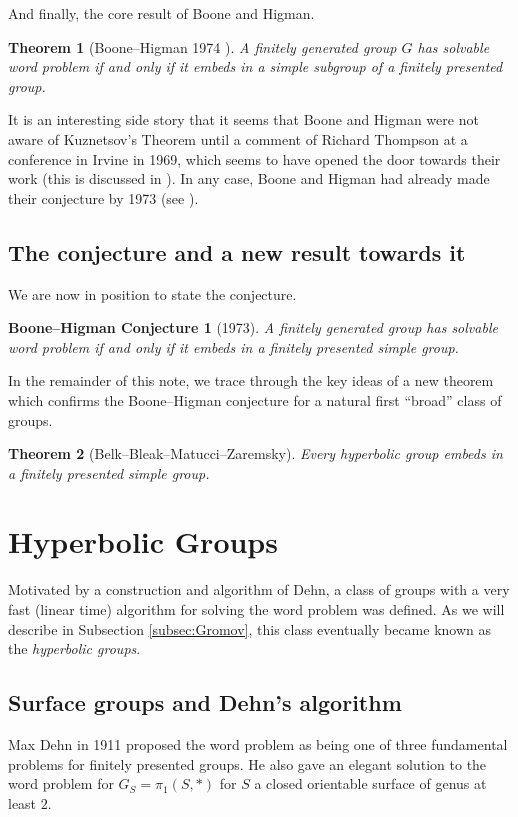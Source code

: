 \documentclass[usenames,dvipsnames]{amsart}
\newtheorem{theorem}{Theorem}[section]
\newtheorem*{conjecture}{Boone--Higman Conjecture}
\theoremstyle{definition}
\begin{document}
And finally, the core result of Boone and Higman.
 
 \begin{theorem}[Boone--Higman 1974 \cite{BooneHigman74}]
 A finitely generated group $G$ has solvable word problem  if and only if it embeds in a simple subgroup of a finitely presented group.
 \end{theorem} 

 It is an interesting side story that it seems that Boone and Higman were not aware of Kuznetsov's Theorem until a comment of Richard Thompson at a conference in Irvine in 1969, which seems to have opened the door towards their work (this is discussed in \cite{BooneHigman74}).  In any case, Boone and Higman had already made their conjecture by 1973 (see \cite{Boone73}).
\subsection{The conjecture and a new result towards it}
We are now in position to state the conjecture.
\begin{conjecture}[1973]
A finitely generated group has solvable word problem if and only if it embeds in a finitely presented simple group.
\end{conjecture}

In the remainder of this note, we trace through the key ideas of a new theorem \cite{BelkBleakMatucciZaremsky} which confirms the Boone--Higman conjecture for a natural first ``broad'' class of groups.
\begin{theorem}[Belk--Bleak--Matucci--Zaremsky]
Every hyperbolic group embeds in a finitely presented simple group.
\end{theorem}


 \section{Hyperbolic Groups}
 Motivated by a construction and algorithm of Dehn, a class of groups with a very fast (linear time) algorithm for solving the word problem was defined.  As we will describe in Subsection \ref{subsec:Gromov}, this class eventually became known as the  \textit{hyperbolic groups}.

 \subsection{Surface groups and Dehn's algorithm}
 Max Dehn in 1911 proposed the word problem as being one of three fundamental problems for finitely presented groups.  He also gave an elegant solution to the word problem for $G_S=\pi_1(S,*)$ for $S$ a closed orientable surface of genus at least $2$.  
 
\end{document}
